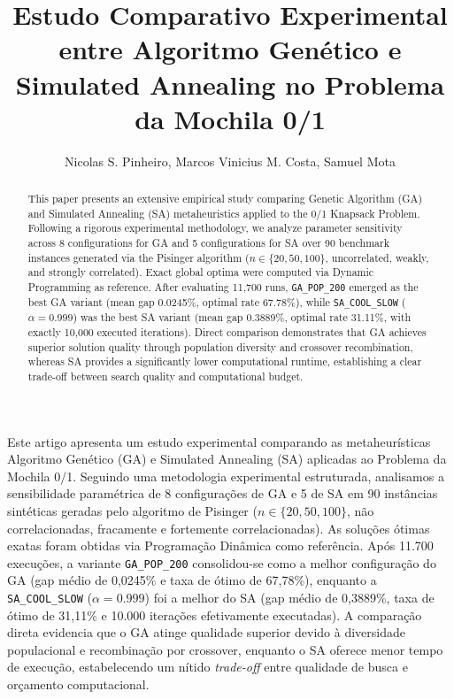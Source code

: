 \documentclass[12pt]{article}
\title{Estudo Comparativo Experimental entre Algoritmo Genético e Simulated Annealing no Problema da Mochila 0/1}
\author{Nicolas S. Pinheiro\inst{1}, Marcos Vinicius M. Costa\inst{1}, Samuel Mota\inst{1}}
\begin{document}
\maketitle

\begin{abstract}
This paper presents an extensive empirical study comparing Genetic Algorithm (GA) and Simulated Annealing (SA) metaheuristics applied to the 0/1 Knapsack Problem. Following a rigorous experimental methodology, we analyze parameter sensitivity across 8 configurations for GA and 5 configurations for SA over 90 benchmark instances generated via the Pisinger algorithm ($n \in \{20, 50, 100\}$, uncorrelated, weakly, and strongly correlated). Exact global optima were computed via Dynamic Programming as reference. After evaluating 11,700 runs, \texttt{GA\_POP\_200} emerged as the best GA variant (mean gap 0.0245\%, optimal rate 67.78\%), while \texttt{SA\_COOL\_SLOW} ($\alpha=0.999$) was the best SA variant (mean gap 0.3889\%, optimal rate 31.11\%, with exactly 10,000 executed iterations). Direct comparison demonstrates that GA achieves superior solution quality through population diversity and crossover recombination, whereas SA provides a significantly lower computational runtime, establishing a clear trade-off between search quality and computational budget.
\end{abstract}

\begin{resumo}
Este artigo apresenta um estudo experimental comparando as metaheurísticas Algoritmo Genético (GA) e Simulated Annealing (SA) aplicadas ao Problema da Mochila 0/1. Seguindo uma metodologia experimental estruturada, analisamos a sensibilidade paramétrica de 8 configurações de GA e 5 de SA em 90 instâncias sintéticas geradas pelo algoritmo de Pisinger ($n \in \{20, 50, 100\}$, não correlacionadas, fracamente e fortemente correlacionadas). As soluções ótimas exatas foram obtidas via Programação Dinâmica como referência. Após 11.700 execuções, a variante \texttt{GA\_POP\_200} consolidou-se como a melhor configuração do GA (gap médio de 0,0245\% e taxa de ótimo de 67,78\%), enquanto a \texttt{SA\_COOL\_SLOW} ($\alpha=0.999$) foi a melhor do SA (gap médio de 0,3889\%, taxa de ótimo de 31,11\% e 10.000 iterações efetivamente executadas). A comparação direta evidencia que o GA atinge qualidade superior devido à diversidade populacional e recombinação por crossover, enquanto o SA oferece menor tempo de execução, estabelecendo um nítido \textit{trade-off} entre qualidade de busca e orçamento computacional.
\end{resumo}
\end{document}
